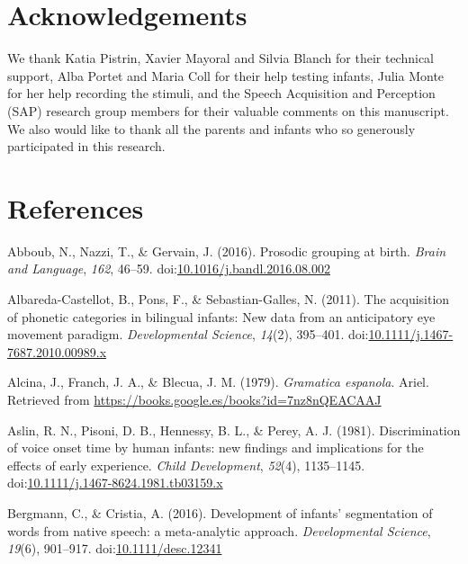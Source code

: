 \documentclass[man,floatsintext]{apa6}
\begin{document}
\hypertarget{acknowledgements}{%
\section{Acknowledgements}\label{acknowledgements}}

We thank Katia Pistrin, Xavier Mayoral and Silvia Blanch for their technical support, Alba Portet and Maria Coll for their help testing infants, Julia Monte for her help recording the stimuli, and the Speech Acquisition and Perception (SAP) research group members for their valuable comments on this manuscript. We also would like to thank all the parents and infants who so generously participated in this research.

\hypertarget{references}{%
\section{References}\label{references}}

\begingroup
\setlength{\parindent}{-0.5in}
\setlength{\leftskip}{0.5in}

\hypertarget{refs}{}
\leavevmode\hypertarget{ref-abboub2016}{}%
Abboub, N., Nazzi, T., \& Gervain, J. (2016). Prosodic grouping at birth. \emph{Brain and Language}, \emph{162}, 46--59. doi:\href{https://doi.org/10.1016/j.bandl.2016.08.002}{10.1016/j.bandl.2016.08.002}

\leavevmode\hypertarget{ref-albaredacastellot2011}{}%
Albareda-Castellot, B., Pons, F., \& Sebastian-Galles, N. (2011). The acquisition of phonetic categories in bilingual infants: New data from an anticipatory eye movement paradigm. \emph{Developmental Science}, \emph{14}(2), 395--401. doi:\href{https://doi.org/10.1111/j.1467-7687.2010.00989.x}{10.1111/j.1467-7687.2010.00989.x}

\leavevmode\hypertarget{ref-alcina1979}{}%
Alcina, J., Franch, J. A., \& Blecua, J. M. (1979). \emph{Gramatica espanola}. Ariel. Retrieved from \url{https://books.google.es/books?id=7nz8nQEACAAJ}

\leavevmode\hypertarget{ref-aslin1981}{}%
Aslin, R. N., Pisoni, D. B., Hennessy, B. L., \& Perey, A. J. (1981). Discrimination of voice onset time by human infants: new findings and implications for the effects of early experience. \emph{Child Development}, \emph{52}(4), 1135--1145. doi:\href{https://doi.org/10.1111/j.1467-8624.1981.tb03159.x}{10.1111/j.1467-8624.1981.tb03159.x}

\leavevmode\hypertarget{ref-bergmann2016}{}%
Bergmann, C., \& Cristia, A. (2016). Development of infants' segmentation of words from native speech: a meta-analytic approach. \emph{Developmental Science}, \emph{19}(6), 901--917. doi:\href{https://doi.org/10.1111/desc.12341}{10.1111/desc.12341}
\end{document}
